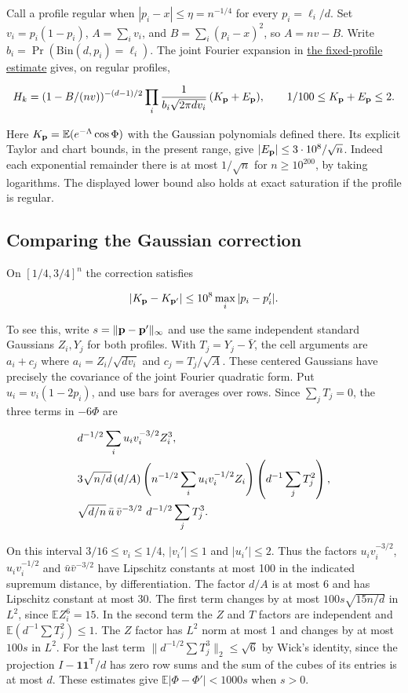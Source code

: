 \documentclass[11pt]{article}
\begin{document}
Call a profile regular when $|p_i-x|\le\eta=n^{-1/4}$ for every $p_i=\ell_i/d$. Set $v_i=p_i(1-p_i)$, $A=\sum_i v_i$, and $B=\sum_i(p_i-x)^2$, so $A=nv-B$. Write $b_i=\Pr(\mathrm{Bin}(d,p_i)=\ell_i)$. The joint Fourier expansion in \href{https://github.com/ProgramComputer/open-math-research/blob/main/topics/balanced-arrays/adjacent-quotas/fixed-profile.md}{the fixed-profile estimate} gives, on regular profiles,

\[
H_k=(1-B/(nv))^{-(d-1)/2}
\prod_i\frac{1}{b_i\sqrt{2\pi d v_i}}\thinspace{}(K_{\bf p}+E_{\bf p}),\qquad
1/100\le K_{\bf p}+E_{\bf p}\le2 .
\]

Here $K_{\bf p}=\mathbb E(e^{-\Lambda}\cos\Phi)$ with the Gaussian polynomials defined there. Its explicit Taylor and chart bounds, in the present range, give $|E_{\bf p}|\le 3\cdot 10^8/\sqrt n$. Indeed each exponential remainder there is at most $1/\sqrt n$ for $n\ge10^{200}$, by taking logarithms. The displayed lower bound also holds at exact saturation if the profile is regular.

\subsection{Comparing the Gaussian correction}

On $[1/4,3/4]^n$ the correction satisfies

\[
|K_{\bf p}-K_{\bf p'}|\le10^8\max_i|p_i-p_i'|.
\]

To see this, write $s=\|{\bf p}-{\bf p'}\|_\infty$ and use the same independent standard Gaussians $Z_i,Y_j$ for both profiles. With $T_j=Y_j-\bar Y$, the cell arguments are $a_i+c_j$ where $a_i=Z_i/\sqrt{dv_i}$ and $c_j=T_j/\sqrt A$. These centered Gaussians have precisely the covariance of the joint Fourier quadratic form. Put $u_i=v_i(1-2p_i)$, and use bars for averages over rows. Since $\sum_jT_j=0$, the three terms in $-6\Phi$ are

\[
\begin{aligned}
& d^{-1/2}\sum_i u_i v_i^{-3/2}Z_i^3,\\
& 3\sqrt{n/d}\thinspace{}(d/A)\left(n^{-1/2}\sum_i u_i v_i^{-1/2}Z_i\right)
\left(d^{-1}\sum_jT_j^2\right),\\
& \sqrt{d/n}\thinspace{}\bar u\thinspace{}\bar v^{-3/2}\ d^{-1/2}\sum_jT_j^3 .
\end{aligned}
\]

On this interval $3/16\le v_i\le1/4$, $|v_i'|\le1$ and $|u_i'|\le2$. Thus the factors $u_i v_i^{-3/2}$, $u_i v_i^{-1/2}$ and $\bar u\bar v^{-3/2}$ have Lipschitz constants at most 100 in the indicated supremum distance, by differentiation. The factor $d/A$ is at most 6 and has Lipschitz constant at most 30. The first term changes by at most $100s\sqrt{15n/d}$ in $L^2$, since $\mathbb E Z_i^6=15$. In the second term the $Z$ and $T$ factors are independent and $\mathbb E(d^{-1}\sum T_j^2)\le1$. The $Z$ factor has $L^2$ norm at most 1 and changes by at most $100s$ in $L^2$. For the last term $\|d^{-1/2}\sum T_j^3\|_2\le\sqrt6$ by Wick's identity, since the projection $I-\mathbf1\mathbf1^\mathsf T/d$ has zero row sums and the sum of the cubes of its entries is at most $d$. These estimates give $\mathbb E|\Phi-\Phi'|<1000s$ when $s>0$.
\end{document}
